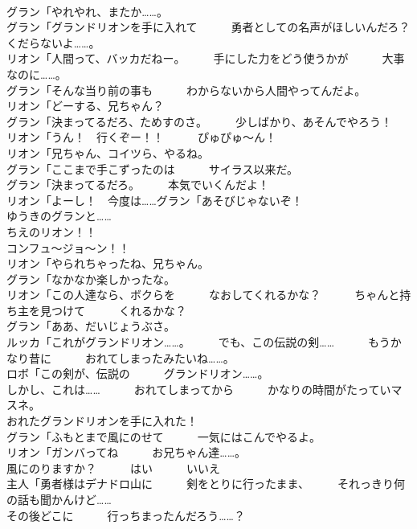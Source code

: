 \documentclass[8pt]{extreport}
\begin{document}
\begin{CJK}{UTF8}{min}
\\	グラン「やれやれ、またか……。	
\\	グラン「グランドリオンを手に入れて　　　勇者としての名声がほしいんだろ？　　　くだらないよ……。	
\\	リオン「人間って、バッカだねー。　　　手にした力をどう使うかが　　　大事なのに……。	
\\	グラン「そんな当り前の事も　　　わからないから人間やってんだよ。	
\\	リオン「どーする、兄ちゃん？	
\\	グラン「決まってるだろ、ためすのさ。　　　少しばかり、あそんでやろう！	
\\	リオン「うん！　行くぞー！！　　　ぴゅぴゅ～ん！	
\\	リオン「兄ちゃん、コイツら、やるね。	
\\	グラン「ここまで手こずったのは　　　サイラス以来だ。	
\\	グラン「決まってるだろ。　　　本気でいくんだよ！	
\\	リオン「よーし！　今度は……グラン「あそびじゃないぞ！	
\\	ゆうきのグランと……	
\\	ちえのリオン！！	
\\	コンフュ～ジョ～ン！！	
\\	リオン「やられちゃったね、兄ちゃん。	
\\	グラン「なかなか楽しかったな。	
\\	リオン「この人達なら、ボクらを　　　なおしてくれるかな？　　　ちゃんと持ち主を見つけて　　　くれるかな？	
\\	グラン「ああ、だいじょうぶさ。	
\\	ルッカ「これがグランドリオン……。　　　でも、この伝説の剣……　　　もうかなり昔に　　　おれてしまったみたいね……。	
\\	ロボ「この剣が、伝説の　　　グランドリオン……。	
\\	しかし、これは……　　　おれてしまってから　　　かなりの時間がたっていマスネ。	
\\	おれたグランドリオンを手に入れた！	
\\	グラン「ふもとまで風にのせて　　　一気にはこんでやるよ。	
\\	リオン「ガンバってね　　　お兄ちゃん達……。	
\\	風にのりますか？　　　はい　　　いいえ	
\\	主人「勇者様はデナドロ山に　　　剣をとりに行ったまま、　　　それっきり何の話も聞かんけど……	
\\	その後どこに　　　行っちまったんだろう……？	

\end{CJK}
\end{document}
